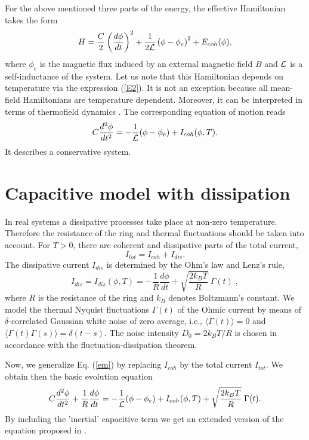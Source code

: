 \documentclass[a4paper,final]{appolb}
\begin{document}
For the above mentioned  three parts of the energy,  
the effective Hamiltonian takes the form 
%
\begin{equation} \label{H}
H=\frac{C}{2}\left(\frac{d\phi}{dt}\right)^2+\frac{1}{2{\cal L}}
\left(\phi-\phi_e\right)^2+E_{coh}(\phi),
\end{equation} 
%
where $\phi_e$ is the magnetic flux induced by an  external magnetic field $B$ and ${\cal L}$ is a self-inductance of the system. Let us note that this 
Hamiltonian depends on temperature via the expression (\ref{E2}). It is not an exception because all mean-field Hamiltonians are temperature dependent. Moreover, it can be 
interpreted in terms of thermofield dynamics \cite{termo}.  
The corresponding  equation of motion reads
%
\begin{equation} \label{em}
C\frac{d^2\phi}{dt^2}=-\frac{1}{{\cal L}}(\phi-\phi_e)+I_{coh}(\phi,T).
\end{equation}
%
It describes a conservative system. 


\section{Capacitive model with dissipation}

In  real systems a dissipative processes take place at non-zero temperature. 
Therefore the resistance of the ring and thermal fluctuations should be taken into account. For $T>0$, there are coherent and dissipative parts of the total current, 
%
\begin{equation} \label{I}
I_{tot}=I_{coh} + I_{dis}.
\end{equation}
% 
The dissipative current $I_{dis}$ is determined by
 the Ohm's law and Lenz's rule, 
%
\begin{equation}   \label{inor}
I_{dis} = I_{dis}(\phi, T)=-\frac{1}{R}\frac{d\phi}{dt}
+\sqrt{\frac{2k_BT}{R}}~\Gamma(t)\;,
\end{equation}
%
where $R$ is the resistance of the ring and  $k_B$
denotes  Boltzmann's constant. We model 
the thermal Nyquist fluctuations $\Gamma(t)$ of the Ohmic current by means
of  $\delta$-correlated Gaussian white noise of zero average, i.e.,
$\langle \Gamma(t)\rangle=0$ and
$\langle\Gamma(t)\Gamma(s)\rangle=\delta(t-s)$. The
noise  intensity $D_0=2k_BT/R$ is chosen in accordance with
the  fluctuation-dissipation theorem.  

Now, we generalize Eq. (\ref{em}) by replacing $I_{coh}$ by the total current 
 $I_{tot}$. 
We obtain then the basic evolution equation
%
\begin{equation}\label{2}
C\frac{d^2\phi}{dt^2}+\frac{1}{R}\frac{d\phi}{dt} = -\frac{1}{{\cal L}}(\phi-\phi_{e}) + I_{coh}(\phi, T) +
\sqrt{\frac{2 k_BT}{R}}\;\Gamma (t). 
\end{equation}
%
By including the 'inertial'  capacitive term we get an extended version of the
equation proposed in \cite{daj1}.
\end{document}
